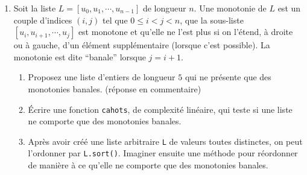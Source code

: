 \begin{enumerate}
\begin{enumerate}
\end{enumerate}
\item Soit la liste $L=[u_0,u_1,\cdots,u_{n-1}]$ de longueur $n$. Une monotonie de $L$ est un couple d'indices $(i,j)$ tel que $0\leq i < j < n$, que la sous-liste $[u_i,u_{i+1},\cdots,u_{j}]$ est monotone et qu'elle ne l'est plus si on l'étend, à droite ou à gauche, d'un élément supplémentaire (lorsque c'est possible). La monotonie est dite ``banale'' lorsque $j=i+1$.
\begin{enumerate}
\item Proposez une liste d'entiers de longueur $5$ qui ne présente que des monotonies banales. (réponse en commentaire)%
\item \'Ecrire une fonction \texttt{cahots}, de complexité linéaire, qui teste si une liste ne comporte que des monotonies banales.
\item Après avoir créé une liste arbitraire \texttt{L} de valeurs toutes distinctes, on peut l'ordonner par \texttt{L.sort()}. Imaginer ensuite une méthode pour réordonner de manière à ce qu'elle ne comporte que des monotonies banales.
\end{enumerate}
\end{enumerate}

















